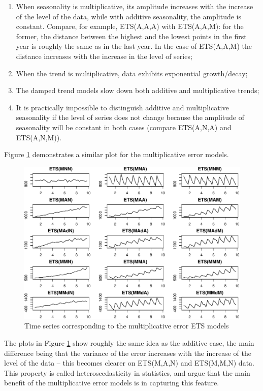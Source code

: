 \documentclass[
]{book}
\providecommand{\tightlist}{%
  \setlength{\itemsep}{0pt}\setlength{\parskip}{0pt}}
\theoremstyle{definition}
\theoremstyle{definition}
\theoremstyle{definition}
\theoremstyle{definition}
\theoremstyle{remark}
\begin{document}
\begin{enumerate}
\def\labelenumi{\arabic{enumi}.}
\tightlist
\item
  When seasonality is multiplicative, its amplitude increases with the increase of the level of the data, while with additive seasonality, the amplitude is constant. Compare, for example, ETS(A,A,A) with ETS(A,A,M): for the former, the distance between the highest and the lowest points in the first year is roughly the same as in the last year. In the case of ETS(A,A,M) the distance increases with the increase in the level of series;
\item
  When the trend is multiplicative, data exhibits exponential growth/decay;
\item
  The damped trend models slow down both additive and multiplicative trends;
\item
  It is practically impossible to distinguish additive and multiplicative seasonality if the level of series does not change because the amplitude of seasonality will be constant in both cases (compare ETS(A,N,A) and ETS(A,N,M)).
\end{enumerate}

Figure \ref{fig:ETSTaxonomyMultiplicative} demonstrates a similar plot for the multiplicative error models.

\begin{figure}
\centering
\includegraphics{Svetunkov--2022----ADAM_files/figure-latex/ETSTaxonomyMultiplicative-1.pdf}
\caption{\label{fig:ETSTaxonomyMultiplicative}Time series corresponding to the multiplicative error ETS models}
\end{figure}

The plots in Figure \ref{fig:ETSTaxonomyMultiplicative} show roughly the same idea as the additive case, the main difference being that the variance of the error increases with the increase of the level of the data -- this becomes clearer on ETS(M,A,N) and ETS(M,M,N) data. This property is called heteroscedasticity in statistics, and \citet{Hyndman2008b} argue that the main benefit of the multiplicative error models is in capturing this feature.
\end{document}
